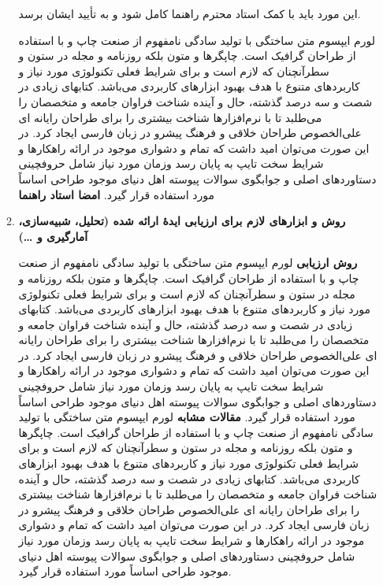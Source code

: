 \documentclass[letterpaper,11pt]{article}
\begin{document}
\begin{enumerate}
\begin{enumerate}
این مورد باید با کمک استاد محترم راهنما کامل شود و به تأیید ایشان برسد.
\begin{mdframed}
لورم ایپسوم متن ساختگی با تولید سادگی نامفهوم از صنعت چاپ و با استفاده از طراحان گرافیک است. چاپگرها و متون بلکه روزنامه و مجله در ستون و سطرآنچنان که لازم است و برای شرایط فعلی تکنولوژی مورد نیاز و کاربردهای متنوع با هدف بهبود ابزارهای کاربردی می‌باشد. کتابهای زیادی در شصت و سه درصد گذشته، حال و آینده شناخت فراوان جامعه و متخصصان را می‌طلبد تا با نرم‌افزارها شناخت بیشتری را برای طراحان رایانه ای علی‌الخصوص طراحان خلاقی و فرهنگ پیشرو در زبان فارسی ایجاد کرد. در این صورت می‌توان امید داشت که تمام و دشواری موجود در ارائه راهکارها و شرایط سخت تایپ به پایان رسد وزمان مورد نیاز شامل حروفچینی دستاوردهای اصلی و جوابگوی سوالات پیوسته اهل دنیای موجود طراحی اساساً مورد استفاده قرار گیرد. \newline\newline
\textbf{امضا استاد راهنما}
\end{mdframed}
  \item \textbf{روش و ابزارهای لازم برای ارزیابی ایدهٔ ارائه شده (تحلیل، شبیه‌سازی، آمارگیری و …)}
\begin{mdframed}
\textbf{روش ارزیابی} \newline
لورم ایپسوم متن ساختگی با تولید سادگی نامفهوم از صنعت چاپ و با استفاده از طراحان گرافیک است. چاپگرها و متون بلکه روزنامه و مجله در ستون و سطرآنچنان که لازم است و برای شرایط فعلی تکنولوژی مورد نیاز و کاربردهای متنوع با هدف بهبود ابزارهای کاربردی می‌باشد. کتابهای زیادی در شصت و سه درصد گذشته، حال و آینده شناخت فراوان جامعه و متخصصان را می‌طلبد تا با نرم‌افزارها شناخت بیشتری را برای طراحان رایانه ای علی‌الخصوص طراحان خلاقی و فرهنگ پیشرو در زبان فارسی ایجاد کرد. در این صورت می‌توان امید داشت که تمام و دشواری موجود در ارائه راهکارها و شرایط سخت تایپ به پایان رسد وزمان مورد نیاز شامل حروفچینی دستاوردهای اصلی و جوابگوی سوالات پیوسته اهل دنیای موجود طراحی اساساً مورد استفاده قرار گیرد. \newline
\textbf{مقالات مشابه} \newline
لورم ایپسوم متن ساختگی با تولید سادگی نامفهوم از صنعت چاپ و با استفاده از طراحان گرافیک است. چاپگرها و متون بلکه روزنامه و مجله در ستون و سطرآنچنان که لازم است و برای شرایط فعلی تکنولوژی مورد نیاز و کاربردهای متنوع با هدف بهبود ابزارهای کاربردی می‌باشد. کتابهای زیادی در شصت و سه درصد گذشته، حال و آینده شناخت فراوان جامعه و متخصصان را می‌طلبد تا با نرم‌افزارها شناخت بیشتری را برای طراحان رایانه ای علی‌الخصوص طراحان خلاقی و فرهنگ پیشرو در زبان فارسی ایجاد کرد. در این صورت می‌توان امید داشت که تمام و دشواری موجود در ارائه راهکارها و شرایط سخت تایپ به پایان رسد وزمان مورد نیاز شامل حروفچینی دستاوردهای اصلی و جوابگوی سوالات پیوسته اهل دنیای موجود طراحی اساساً مورد استفاده قرار گیرد. \newline

\end{mdframed}
\end{enumerate}
\end{enumerate}
\end{document}
